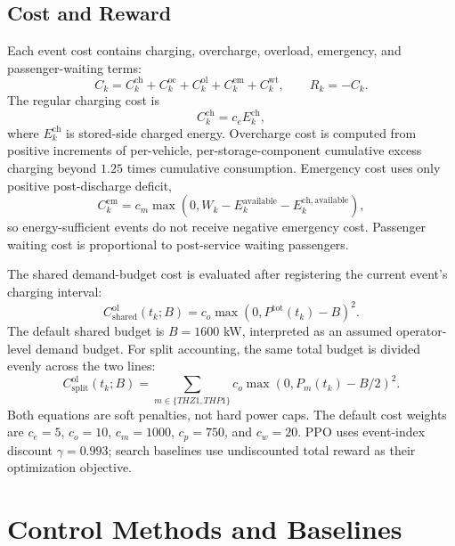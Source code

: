 \documentclass[conference]{IEEEtran}
\newcommand{\thz}{THZ1}
\newcommand{\thp}{THP1}
\begin{document}
\subsection{Cost and Reward}
Each event cost contains charging, overcharge, overload, emergency, and passenger-waiting terms:
\begin{equation}
 C_k = C^{\mathrm{ch}}_k + C^{\mathrm{oc}}_k + C^{\mathrm{ol}}_k + C^{\mathrm{em}}_k + C^{\mathrm{wt}}_k,
 \qquad R_k=-C_k.
\end{equation}
The regular charging cost is
\begin{equation}
 C^{\mathrm{ch}}_k = c_e E^{\mathrm{ch}}_k,
\end{equation}
where $E^{\mathrm{ch}}_k$ is stored-side charged energy. Overcharge cost is computed from positive increments of per-vehicle, per-storage-component cumulative excess charging beyond $1.25$ times cumulative consumption. Emergency cost uses only positive post-discharge deficit,
\begin{equation}
 C^{\mathrm{em}}_k = c_m \max(0, W_k - E^{\mathrm{available}}_k - E^{\mathrm{ch,available}}_k),
\end{equation}
so energy-sufficient events do not receive negative emergency cost. Passenger waiting cost is proportional to post-service waiting passengers.

The shared demand-budget cost is evaluated after registering the current event's charging interval:
\begin{equation}
 C^{\mathrm{ol}}_{\mathrm{shared}}(t_k;B) = c_o \max(0, P^{\mathrm{tot}}(t_k)-B)^2.
\end{equation}
The default shared budget is $B=1600$ kW, interpreted as an assumed operator-level demand budget. For split accounting, the same total budget is divided evenly across the two lines:
\begin{equation}
 C^{\mathrm{ol}}_{\mathrm{split}}(t_k;B) = \sum_{m \in \{\thz,\thp\}} c_o \max(0, P_m(t_k)-B/2)^2.
\end{equation}
Both equations are soft penalties, not hard power caps. The default cost weights are $c_e=5$, $c_o=10$, $c_m=1000$, $c_p=750$, and $c_w=20$. PPO uses event-index discount $\gamma=0.993$; search baselines use undiscounted total reward as their optimization objective.

\section{Control Methods and Baselines}
\end{document}
